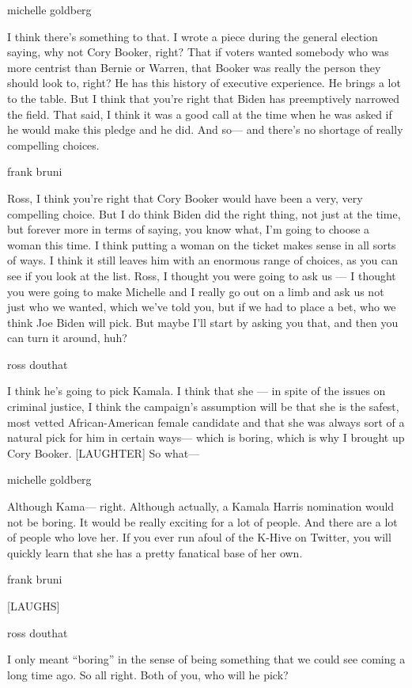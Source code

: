 michelle goldberg

I think there's something to that. I wrote a piece during the general
election saying, why not Cory Booker, right? That if voters wanted
somebody who was more centrist than Bernie or Warren, that Booker was
really the person they should look to, right? He has this history of
executive experience. He brings a lot to the table. But I think that
you're right that Biden has preemptively narrowed the field. That said,
I think it was a good call at the time when he was asked if he would
make this pledge and he did. And so--- and there's no shortage of really
compelling choices.

frank bruni

Ross, I think you're right that Cory Booker would have been a very, very
compelling choice. But I do think Biden did the right thing, not just at
the time, but forever more in terms of saying, you know what, I'm going
to choose a woman this time. I think putting a woman on the ticket makes
sense in all sorts of ways. I think it still leaves him with an enormous
range of choices, as you can see if you look at the list. Ross, I
thought you were going to ask us --- I thought you were going to make
Michelle and I really go out on a limb and ask us not just who we
wanted, which we've told you, but if we had to place a bet, who we think
Joe Biden will pick. But maybe I'll start by asking you that, and then
you can turn it around, huh?

ross douthat

I think he's going to pick Kamala. I think that she --- in spite of the
issues on criminal justice, I think the campaign's assumption will be
that she is the safest, most vetted African-American female candidate
and that she was always sort of a natural pick for him in certain
ways--- which is boring, which is why I brought up Cory Booker.
{[}LAUGHTER{]} So what---

michelle goldberg

Although Kama--- right. Although actually, a Kamala Harris nomination
would not be boring. It would be really exciting for a lot of people.
And there are a lot of people who love her. If you ever run afoul of the
K-Hive on Twitter, you will quickly learn that she has a pretty
fanatical base of her own.

frank bruni

{[}LAUGHS{]}

ross douthat

I only meant ``boring'' in the sense of being something that we could
see coming a long time ago. So all right. Both of you, who will he pick?

